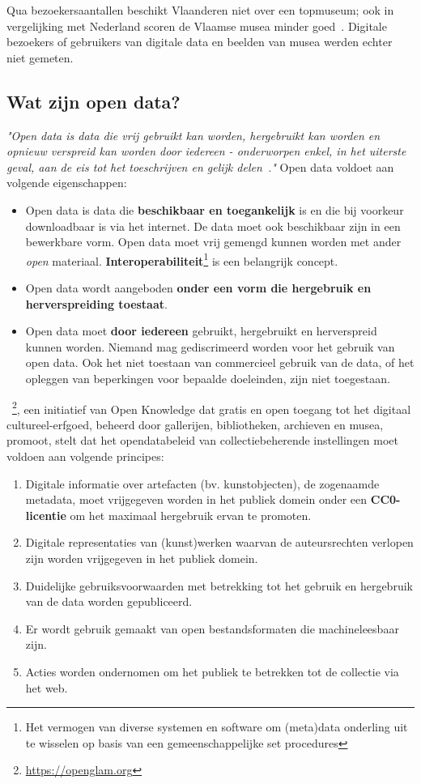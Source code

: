\documentclass[fleqn,10pt]{voorstel}
\begin{document}
Qua bezoekersaantallen beschikt Vlaanderen niet over een topmuseum; ook in vergelijking met Nederland scoren de Vlaamse musea minder goed~\autocite{Gatz2016}. Digitale bezoekers of gebruikers van digitale data en beelden van musea werden echter niet gemeten.

\subsection{Wat zijn open data?}
\emph{"Open data is data die vrij gebruikt kan worden, hergebruikt kan worden en opnieuw verspreid kan worden door iedereen - onderworpen enkel, in het uiterste geval, aan de eis tot het toeschrijven en gelijk delen~\autocite{OKFN2010}."}\newline
Open data voldoet aan volgende eigenschappen:
\begin{itemize}
	\item Open data is data die \textbf{beschikbaar en toegankelijk} is en die bij voorkeur downloadbaar is via het internet. De data moet ook beschikbaar zijn in een bewerkbare vorm. Open data moet vrij gemengd kunnen worden met ander \emph{open} materiaal. \textbf{Interoperabiliteit}\footnote{Het vermogen van diverse systemen en software om (meta)data onderling uit te wisselen op basis van een gemeenschappelijke set procedures} is een belangrijk concept.
	\item Open data wordt aangeboden \textbf{onder een vorm die hergebruik en herverspreiding toestaat}.
	\item Open data moet \textbf{door iedereen} gebruikt, hergebruikt en herverspreid kunnen worden. Niemand mag gediscrimeerd worden voor het gebruik van open data. Ook het niet toestaan van commercieel gebruik van de data, of het opleggen van beperkingen voor bepaalde doeleinden, zijn niet toegestaan.
\end{itemize}

~\textcite{openGLAM2016}\footnote{\href{https://openglam.org}{https://openglam.org}}, een initiatief van Open Knowledge dat gratis en open toegang tot het digitaal cultureel-erfgoed, beheerd door gallerijen, bibliotheken, archieven en musea, promoot, stelt dat het opendatabeleid van collectiebeherende instellingen moet voldoen aan volgende principes:
\begin{enumerate}
	\item Digitale informatie over artefacten (bv. kunstobjecten), de zogenaamde metadata, moet vrijgegeven worden in het publiek domein onder een \textbf{CC0-licentie} om het maximaal hergebruik ervan te promoten.
	\item Digitale representaties van (kunst)werken waarvan de auteursrechten verlopen zijn worden vrijgegeven  in het publiek domein.
	\item  Duidelijke gebruiksvoorwaarden met betrekking tot het gebruik en hergebruik van de data worden gepubliceerd.
	\item Er wordt gebruik gemaakt van open bestandsformaten die machineleesbaar zijn.
	\item Acties worden ondernomen om het publiek te betrekken tot de collectie via het web.
\end{enumerate}
\end{document}
